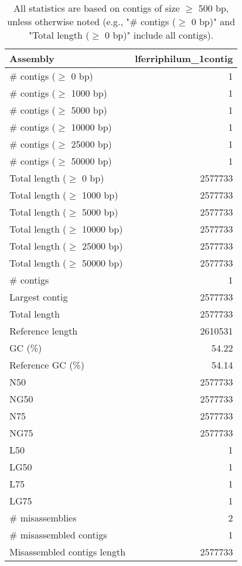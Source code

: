 \documentclass[12pt,a4paper]{article}
\begin{document}
\begin{table}[ht]
\begin{center}
\caption{All statistics are based on contigs of size $\geq$ 500 bp, unless otherwise noted (e.g., "\# contigs ($\geq$ 0 bp)" and "Total length ($\geq$ 0 bp)" include all contigs).}
\begin{tabular}{|l*{1}{|r}|}
\hline
Assembly & lferriphilum\_1contig \\ \hline
\# contigs ($\geq$ 0 bp) & 1 \\ \hline
\# contigs ($\geq$ 1000 bp) & 1 \\ \hline
\# contigs ($\geq$ 5000 bp) & 1 \\ \hline
\# contigs ($\geq$ 10000 bp) & 1 \\ \hline
\# contigs ($\geq$ 25000 bp) & 1 \\ \hline
\# contigs ($\geq$ 50000 bp) & 1 \\ \hline
Total length ($\geq$ 0 bp) & 2577733 \\ \hline
Total length ($\geq$ 1000 bp) & 2577733 \\ \hline
Total length ($\geq$ 5000 bp) & 2577733 \\ \hline
Total length ($\geq$ 10000 bp) & 2577733 \\ \hline
Total length ($\geq$ 25000 bp) & 2577733 \\ \hline
Total length ($\geq$ 50000 bp) & 2577733 \\ \hline
\# contigs & 1 \\ \hline
Largest contig & 2577733 \\ \hline
Total length & 2577733 \\ \hline
Reference length & 2610531 \\ \hline
GC (\%) & 54.22 \\ \hline
Reference GC (\%) & 54.14 \\ \hline
N50 & 2577733 \\ \hline
NG50 & 2577733 \\ \hline
N75 & 2577733 \\ \hline
NG75 & 2577733 \\ \hline
L50 & 1 \\ \hline
LG50 & 1 \\ \hline
L75 & 1 \\ \hline
LG75 & 1 \\ \hline
\# misassemblies & 2 \\ \hline
\# misassembled contigs & 1 \\ \hline
Misassembled contigs length & 2577733 \\ \hline

\end{tabular}
\end{center}
\end{table}
\end{document}
